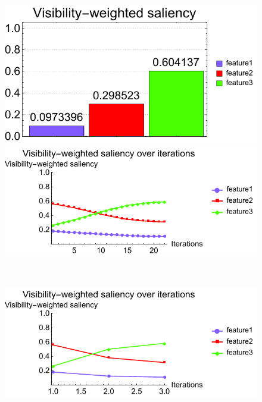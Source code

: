 \begin{figure}
\begin{minipage}{.3\textwidth}
		\subcaption{}
	\end{minipage}~
	\begin{minipage}{.3\textwidth}
		\includegraphics[width=1\linewidth]{figures/nucleon_naive_proportional_optimized_linesearch_visibility_saliency_weighted_chart}
		\subcaption{}
	\end{minipage}
	
	\begin{minipage}{.49\textwidth}
		\includegraphics[width=1\linewidth]{figures/nucleon_naive_proportional_saliency_fixed}
		\subcaption{}
	\end{minipage}~
	\begin{minipage}{.49\textwidth}
		\includegraphics[width=1\linewidth]{figures/nucleon_naive_proportional_saliency_parallelsearch}
		\subcaption{}
	\end{minipage}
	

\end{figure}
